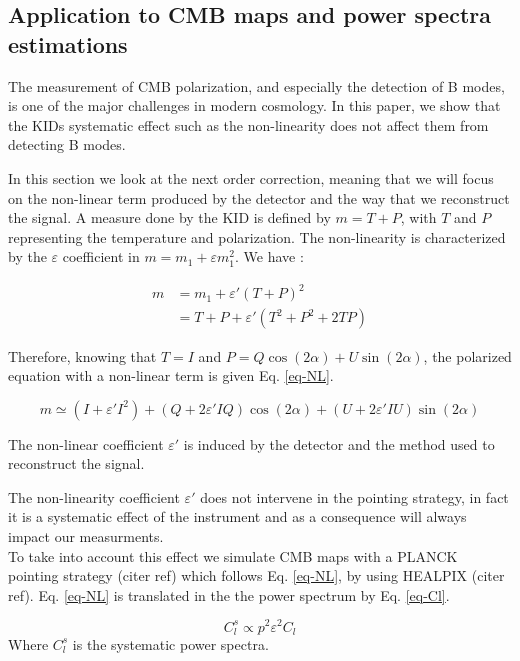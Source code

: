 \subsection{Application to CMB maps and power spectra estimations}
The measurement of CMB polarization, and especially the detection of B modes, is one of the major challenges in modern cosmology. In this paper, we show that the KIDs systematic effect such as the non-linearity does not affect them from detecting B modes.

In this section we look at the next order correction, meaning that we will focus on the non-linear term produced by the detector and the way that we reconstruct the signal. A measure done by the KID is defined by $m = T + P$, with $T$ and $P$ representing the temperature and polarization. The non-linearity is characterized  by the $\varepsilon$ coefficient in $ m = m_{1} + \varepsilon m_{1}^{2}$. We have : 

\begin{equation}
\begin{split}
m & = m_{1} +\varepsilon' (T+P)^{2} \\
 & = T + P + \varepsilon'(T^{2} + P^{2} + 2TP) 
\end{split}
\end{equation}

Therefore, knowing that $T=I$ and $P = Q\cos(2\alpha) + U \sin(2\alpha)$, the polarized equation with a non-linear term is given Eq. \ref{eq-NL}.

\begin{equation}
m  \simeq (I + \varepsilon' I^{2}) + (Q + 2\varepsilon' IQ) \cos(2\alpha) + (U + 2 \varepsilon' IU) \sin(2\alpha)
\label{eq-NL}
\end{equation}

The non-linear coefficient $\varepsilon'$ is induced by the detector and the method used to reconstruct the signal.


The non-linearity coefficient $\varepsilon'$ does not intervene in the pointing strategy, in fact it is a systematic effect of the instrument and as a consequence will always impact our measurments. \\
To take into account this effect we simulate CMB maps with a PLANCK pointing strategy (citer ref) which follows Eq. \ref{eq-NL}, by using HEALPIX (citer ref).
Eq. \ref{eq-NL} is translated in the the power spectrum by Eq. \ref{eq-Cl}.

\begin{equation}
C_{l}^{s} \propto p^{2} \varepsilon^{2} C_{l}
\label{eq-Cl}
\end{equation}
Where $C_{l}^{s}$ is the systematic power spectra.\\


